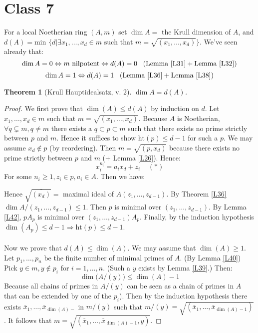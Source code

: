\documentclass{article}
\theoremstyle{plain}
\newtheorem{thm}{Theorem}
\theoremstyle{definition}
\theoremstyle{remark}
\begin{document}
\section*{Class 7}
For a local Noetherian ring $(A,m)$ set $\dim A = $ the Krull dimension of $A$, and $d(A) = \text{min } \{d| \exists x_1, \dots, x_d \in m \text{ such that } m = \sqrt{(x_1, \dots, x_d)}\}$. We've seen already that:
\[        \dim A = 0 \Leftrightarrow m \text{ nilpotent} \Leftrightarrow d(A) = 0   \;\;\; (\text{Lemma } \ref{L31} + \text{Lemma } \ref{L32})  \]
\[       \dim A = 1 \Leftrightarrow d(A) = 1 \;\;\; (\text{Lemma } \ref{L36} + \text{Lemma } \ref{L38})    \]

\begin{thm} [Krull Hauptidealsatz, v. 2]
\label{L41}
$\dim A = d(A)$.
\end{thm}
\begin{proof}
We first prove that $\dim(A) \leq d(A)$ by induction on $d$. Let $x_1, \dots,x_d \in m$ such that $m = \sqrt{(x_1, \dots, x_d)}$. Because $A$ is Noetherian, $\forall q\subsetneq m, q\neq m$ there exists a $q\subset p \subset m$ such that there exists no prime strictly between $p$ and $m$. Hence it suffices to show $\text{ht}(p)\leq d-1$ for such a $p$. We may assume $x_d \not \in p$ (by reordering). Then $m = \sqrt{(p, x_d)}$ because there exists no prime strictly between $p$ and $m$ (+ Lemma \ref{L26}). Hence:
\[      x_i^{n_i} = a_i x_d + z_i \;\;\;\; (*)      \]
For some $n_i\geq 1, z_i \in p, a_i \in A$. Then we have:

Hence $\sqrt{\overline{(x_d)}} = $ maximal ideal of $A(z_1, \dots, z_{d-1})$. By Theorem \ref{L36} $\dim A/(z_1, \dots , z_{d-1}) \leq 1$. Then $p$ is minimal over $(z_1, \dots, z_{d-1})$. By Lemma \ref{L42}, $pA_p$ is minimal over $(z_1, \dots, z_{d-1})A_p$. Finally, by the induction hypothesis $\dim(A_p) \leq d-1 \Rightarrow \text{ht}(p) \leq d-1$.
\\
\\
Now we prove that $d(A) \leq \dim(A)$. We may assume that $\dim(A) \geq 1$. Let $p_1, \dots, p_n$ be the finite number of minimal primes of $A$. (By Lemma \ref{L40}) Pick $y\in m, y \not \in p_i$ for $i=1, \dots, n$. (Such a $y$ exists by Lemma \ref{L39}.) Then:
\[         \dim \big(A/(y)\big) \leq \dim(A) -1        \]
Because all chains of primes in $A/(y)$ can be seen as a chain of primes in $A$ that can be extended by one of the $p_i$). Then by the induction hypothesis there exists $\bar x_1 , \dots , \bar x_{\dim(A)-}$ in $m/(y)$ such that $m/(y) = \sqrt{(\bar x_1, \dots, \bar x_{\dim(A)-1})}$. It follows that $m = \sqrt{(\bar x_1, \dots, \bar x_{\dim(A)-1}, y)}$.
\end{proof}
\end{document}

